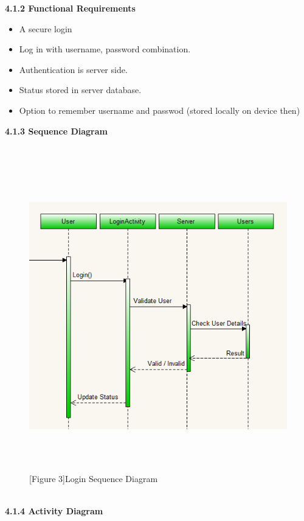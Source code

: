\documentclass[29pt,a4paper]{moderncv}
\begin{document}
		\noindent\textbf{4.1.2 Functional Requirements}
			\begin{itemize}
				\item A secure login
				\item Log in with username, password combination.
				\item Authentication is server side.
				\item Status stored in server database.
				\item Option to remember username and passwod (stored locally on device then)\\			
			\end{itemize}
			
\newpage	
			\left\textbf{4.1.3 Sequence Diagram}\\
			\\ \begin{figure}
				\centering
			\\	\includegraphics[width=5.5in, height=5.0in]{./loginActivity1.png}
				\\\caption{[Figure 3]Login Sequence Diagram}
			\end{figure}	\\
\newpage
			\left\textbf{4.1.4 Activity Diagram}\\
\end{document}
